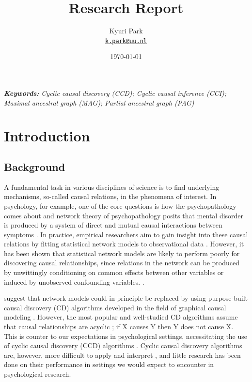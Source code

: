 \documentclass[11pt]{article}
\title{Research Report}
\author{Kyuri Park\\%
    \href{mailto:k.park@uu.nl}{\texttt{k.park@uu.nl}}} %
\date{\today}
\theoremstyle{definition}
\begin{document}
{
\maketitle

\noindent
\textit{\textbf{Keywords: }%
Cyclic causal discovery (CCD); Cyclic causal inference (CCI); Maximal ancestral graph (MAG); Partial ancestral graph (PAG)} \\ %
\noindent
}


\section{Introduction}

\subsection{Background}

A fundamental task in various disciplines of science is to find underlying mechanisms, so-called causal relations, in the phenomena of interest. In psychology, for example, one of the core questions is how the psychopathology comes about and network theory of psychopathology posits that mental disorder is produced by a system of direct and mutual causal interactions between symptoms \citep{BorsboomCramer2013}. In practice, empirical researchers aim to gain insight into these causal relations by fitting statistical network models to observational data \citep{robinaugh2020}. However, it has been shown that statistical network models are likely to perform poorly for discovering causal relationships, since relations in the network can be produced by unwittingly conditioning on common effects between other variables or induced by unobserved confounding variables. \citep{Ryan2022}.

\cite{Ryan2022} suggest that network models could in principle be replaced by using purpose-built causal discovery (CD) algorithms developed in the field of graphical causal modeling \citep{spirtes_algorithm_1991}. However, the most popular and well-studied CD algorithms assume that causal relationships are acyclic \citep{Glymour2019}; if X causes Y then Y does not cause X. This is counter to our expectations in psychological settings, necessitating the use of cyclic causal discovery (CCD) algorithms \citep{richardson1996}. Cyclic causal discovery algorithms are, however, more difficult to apply and interpret \citep{Bongers2021}, and little research has been done on their performance in settings we would expect to encounter in psychological research.
\end{document}

